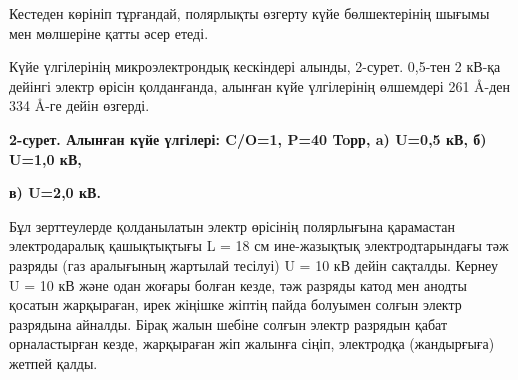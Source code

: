 Кестеден көрініп тұрғандай, полярлықты өзгерту күйе бөлшектерінің шығымы
мен мөлшеріне қатты әсер етеді.

Күйе үлгілерінің микроэлектрондық кескіндері алынды, 2-сурет. 0,5-тен 2
кВ-қа дейінгі электр өрісін қолданғанда, алынған күйе үлгілерінің
өлшемдері 261 Å-ден 334 Å-ге дейін өзгерді.

% 
% 
% 

{\bfseries 2-сурет. Алынған күйе үлгілері: C/O=1, P=40 Toрр, a) U=0,5 кВ,
б) U=1,0 кВ,}

{\bfseries в) U=2,0 кВ.}

Бұл зерттеулерде қолданылатын электр өрісінің полярлығына қарамастан
электродаралық қашықтықтығы L = 18 см ине-жазықтық электродтарындағы тәж
разряды (газ аралығының жартылай тесілуі) U = 10 кВ дейін сақталды.
Кернеу U = 10 кВ және одан жоғары болған кезде, тәж разряды катод мен
анодты қосатын жарқыраған, ирек жіңішке жіптің пайда болуымен солғын
электр разрядына айналды. Бірақ жалын шебіне солғын электр разрядын
қабат орналастырған кезде, жарқыраған жіп жалынға сіңіп, электродқа
(жандырғыға) жетпей қалды.

